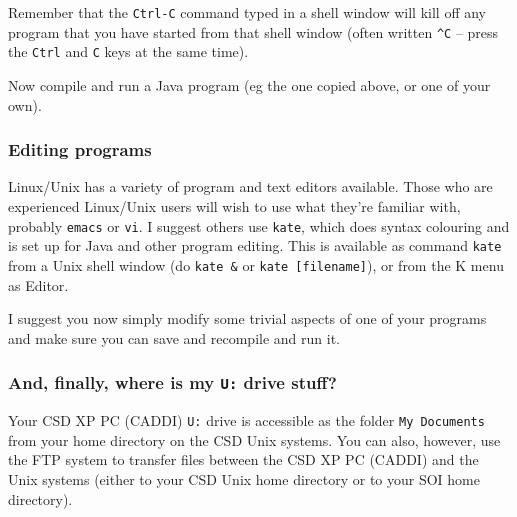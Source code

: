 \documentclass{article}
\begin{document}
Remember that the \verb+Ctrl-C+ command typed in a shell window
will kill off any program that you have started from that 
shell window (often written \verb+^C+ -- 
press the \verb+Ctrl+ and \verb+C+ keys at the same time). 

Now compile and run a Java program
(eg the one copied above, or one of your own). 

\subsubsection*{Editing programs}

Linux/Unix has a variety of program and text editors available.
Those who are experienced Linux/Unix
users will wish to use what they're familiar with, probably
\verb+emacs+ or \verb+vi+. I suggest others use \verb+kate+,
which does syntax colouring and is set up for Java and other
program editing. This is available as command \verb+kate+ from
a Unix shell window (do \verb+kate &+ or \verb+kate [filename]+), 
or from the K menu as Editor.

I suggest you now simply modify some trivial aspects of
one of your programs and make sure you can save and recompile and
run it. 

\subsubsection*{And, finally, where is my {\tt U:} drive stuff?}

Your CSD XP PC (CADDI) \verb+U:+ drive is accessible as the folder
\verb+My Documents+ from your home directory on the CSD Unix systems. 
You can also, however, use the FTP system
to transfer files {\em\/} between the CSD XP PC (CADDI) and the 
Unix systems (either to your CSD Unix home directory or to your 
SOI home directory).
\end{document}
